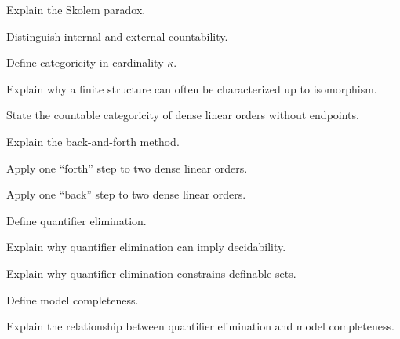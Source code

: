 \begin{exercise}[3]
Explain the Skolem paradox.
\end{exercise}

\begin{exercise}[3]
Distinguish internal and external countability.
\end{exercise}

\begin{exercise}[2]
Define categoricity in cardinality \(\kappa\).
\end{exercise}

\begin{exercise}[3]
Explain why a finite structure can often be characterized up to
isomorphism.
\end{exercise}

\begin{exercise}[3]
State the countable categoricity of dense linear orders without endpoints.
\end{exercise}

\begin{exercise}[3]
Explain the back-and-forth method.
\end{exercise}

\begin{exercise}[3]
Apply one ``forth'' step to two dense linear orders.
\end{exercise}

\begin{exercise}[3]
Apply one ``back'' step to two dense linear orders.
\end{exercise}

\begin{exercise}[2]
Define quantifier elimination.
\end{exercise}

\begin{exercise}[3]
Explain why quantifier elimination can imply decidability.
\end{exercise}

\begin{exercise}[3]
Explain why quantifier elimination constrains definable sets.
\end{exercise}

\begin{exercise}[3]
Define model completeness.
\end{exercise}

\begin{exercise}[3]
Explain the relationship between quantifier elimination and model
completeness.
\end{exercise}

